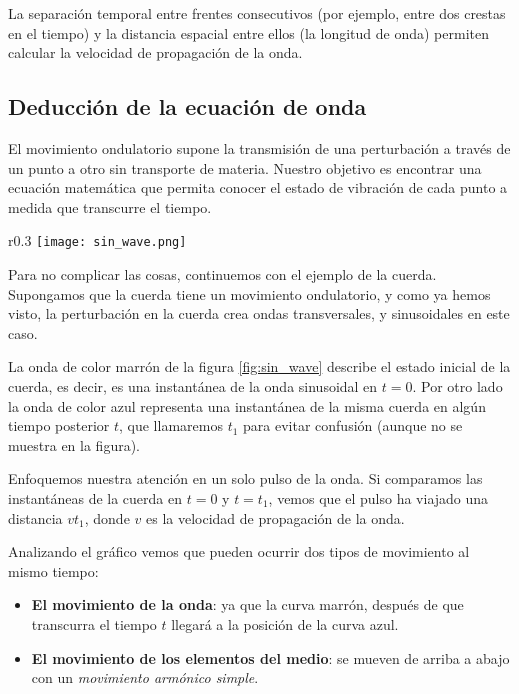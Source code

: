 La separación temporal entre frentes consecutivos (por ejemplo, entre dos crestas en el tiempo) y la distancia espacial entre ellos (la longitud de onda) permiten calcular la velocidad de propagación de la onda.

\subsection{Deducción de la ecuación de onda}

El movimiento ondulatorio supone la transmisión de una perturbación a través de un punto a otro sin transporte de materia. Nuestro objetivo es encontrar una ecuación matemática que permita conocer el estado de vibración de cada punto a medida que transcurre el tiempo.

\begin{wrapfigure}{r}{0.3\textwidth}
  \centering
  \texttt{[image: sin\_wave.png]}
  \caption{Onda sinusoidal que viaja hacia la derecha con una rapidez \(v\).}
  \label{fig:sin_wave}
\end{wrapfigure}
Para no complicar las cosas, continuemos con el ejemplo de la cuerda. Supongamos que la cuerda tiene un movimiento ondulatorio, y como ya hemos visto, la perturbación en la cuerda crea ondas transversales, y sinusoidales en este caso. 

La onda de color marrón de la figura \ref{fig:sin_wave} describe el estado inicial de la cuerda, es decir, es una instantánea de la onda sinusoidal en \(t=0\). Por otro lado la onda de color azul representa una instantánea de la misma cuerda en algún tiempo posterior \(t\), que llamaremos \(t_1\) para evitar confusión (aunque no se muestra en la figura).

Enfoquemos nuestra atención en un solo pulso de la onda. Si comparamos las instantáneas de la cuerda en \(t=0\) y \(t=t_1\), vemos que el pulso ha viajado una distancia \(v t_1\), donde \(v\) es la velocidad de propagación de la onda. 

Analizando el gráfico vemos que pueden ocurrir dos tipos de movimiento al mismo tiempo:
\begin{itemize}
  \item \textbf{El movimiento de la onda}: ya que la curva marrón, después de que transcurra el tiempo \(t\) llegará a la posición de la curva azul.
  \item \textbf{El movimiento de los elementos del medio}: se mueven de arriba a abajo con un \textit{movimiento armónico simple}. 
\end{itemize}


